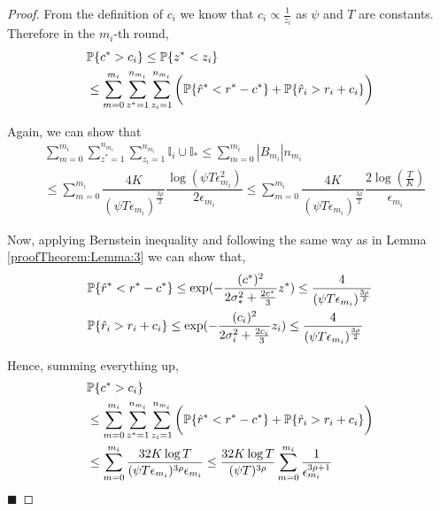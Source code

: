 \begin{proof}
From the definition of $c_i$ we know that $c_i\propto \frac{1}{z_i}$ as $\psi$ and $T$ are constants. Therefore in the $m_i$-th round,
\begin{align*}
&\mathbb{P}\lbrace c^{*} > c_i \rbrace
\leq  \mathbb{P}\lbrace  z^* < z_i  \rbrace \\
&\leq \sum_{m=0}^{m_i}\sum_{z^* =1}^{n_{m_i}}\sum_{z_i =1}^{n_{m_i}}\bigg(\mathbb{P}\lbrace \hat{r}^* < r^* - c^{*}\rbrace + \mathbb{P}\lbrace \hat{r}_i > r_i + c_i\rbrace\bigg)
\end{align*}

Again, we can show that
\begin{align*}
&\sum_{m=0}^{m_i}\sum_{z^* =1}^{n_{m_i}}\sum_{z_i =1}^{n_{m_i}}\mathbb{I}_{i}\cup\mathbb{I}_{*} \leq \sum_{m=0}^{m_i}|B_{m_i}|n_{m_i} \\
&\leq \sum_{m=0}^{m_i}\dfrac{4K}{(\psi T \epsilon_{m_i})^{\frac{3\rho}{2}}}\dfrac{\log{(\psi T\epsilon_{m_{i}}^{2})}}{2\epsilon_{m_{i}}} 
\leq \sum_{m=0}^{m_i}\dfrac{4K}{(\psi T \epsilon_{m_i})^{\frac{3\rho}{2}}}\dfrac{2\log(\frac{T}{K})}{\epsilon_{m_i}}
\end{align*}

Now, applying Bernstein inequality and following the same way as in Lemma \ref{proofTheorem:Lemma:3} we can show that,
\begin{align*}
&\mathbb{P}\lbrace \hat{r}^* < r^* - c^{*}\rbrace \leq \exp(- \frac{(c^{*})^2}{2\sigma_*^2 + \frac{2 c^{*}}{3}} z^*)\leq \frac{4}{(\psi T\epsilon_{m_i})^{\frac{3\rho}{2}}} \\ 
&\mathbb{P}\lbrace \hat{r}_i > r_i + c_i\rbrace \leq \exp(- \frac{(c_{i})^2}{2\sigma_i^2 + \frac{2 c_{i}}{3}} z_i)\leq \frac{4}{(\psi T\epsilon_{m_i})^{\frac{3\rho}{2}}}
\end{align*}

Hence, summing everything up, 
\begin{align*}
&\mathbb{P}\lbrace c^{*} > c_i \rbrace \\
&\leq \sum_{m=0}^{m_i}\sum_{z^* =1}^{n_{m_i}}\sum_{z_i =1}^{n_{m_i}}\bigg(\mathbb{P}\lbrace \hat{r}^* < r^* - c^{*}\rbrace + \mathbb{P}\lbrace \hat{r}_i > r_i + c_i\rbrace\bigg)\\
&\leq \sum_{m=0}^{m_i}\dfrac{32K\log T}{(\psi T\epsilon_{m_i})^{3\rho}\epsilon_{m_i}} \leq 
\dfrac{32K\log T}{(\psi T)^{3\rho}}\sum_{m=0}^{m_i}\dfrac{1}{\epsilon_{m_i}^{3\rho + 1}} 
\end{align*}
\hfill $\blacksquare$	
\end{proof}



